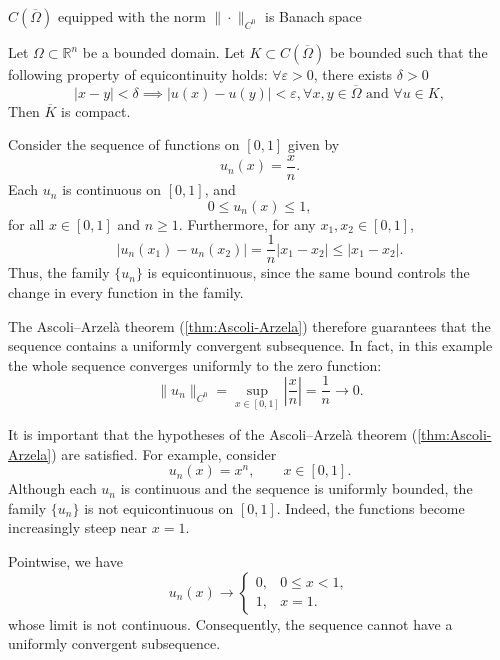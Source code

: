 \begin{remark}
    $C(\overline{\Omega})$ equipped with the norm $\|\cdot \|_{C^0}$ is Banach space
\end{remark}

\begin{theorem}
    \label{thm:Ascoli-Arzela}
    Let $\Omega \subset \mathbb{R}^n$ be a bounded domain. Let $K \subset C(\overline{\Omega})$ be bounded such that the following property of equicontinuity holds: $\forall \varepsilon >0$, there exists $\delta > 0$ 
    \[
    |x-y| < \delta \implies |u(x) - u(y)| < \varepsilon, \forall x,y \in \overline{\Omega} \text{ and } \forall u\in K,
    \]
    Then $\overline{K}$ is compact.
\end{theorem}

\begin{example}
Consider the sequence of functions on $[0,1]$ given by
\[
    u_n(x)=\frac{x}{n}.
\]
Each $u_n$ is continuous on $[0,1]$, and
\[
    0\leq u_n(x)\leq 1,
\]
for all $x\in[0,1]$ and $n\geq1$. Furthermore, for any
$x_1,x_2\in[0,1]$,
\[
    |u_n(x_1)-u_n(x_2)|
    =\frac{1}{n}|x_1-x_2|
    \leq |x_1-x_2|.
\]
Thus, the family $\{u_n\}$ is equicontinuous, since the same bound
controls the change in every function in the family.

The Ascoli--Arzel\`a theorem (\ref{thm:Ascoli-Arzela}) therefore guarantees that the sequence
contains a uniformly convergent subsequence. In fact, in this example
the whole sequence converges uniformly to the zero function:
\[
    \|u_n\|_{C^0}
    =\sup_{x\in[0,1]}\left|\frac{x}{n}\right|
    =\frac{1}{n}
    \longrightarrow 0.
\]
\end{example}

\begin{remark}
It is important that the hypotheses of the Ascoli--Arzel\`a theorem (\ref{thm:Ascoli-Arzela})  are
satisfied. For example, consider
\[
    u_n(x)=x^n,\qquad x\in[0,1].
\]
Although each $u_n$ is continuous and the sequence is uniformly
bounded, the family $\{u_n\}$ is not equicontinuous on $[0,1]$.
Indeed, the functions become increasingly steep near $x=1$.

Pointwise, we have
\[
    u_n(x)\longrightarrow
    \begin{cases}
        0, & 0\leq x<1,\\
        1, & x=1.
    \end{cases}
\]
whose limit is not continuous. Consequently, the sequence cannot have
a uniformly convergent subsequence.
\end{remark}

